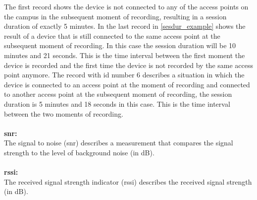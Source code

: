 The first record shows the device is not connected to any of the access points on the campus in the subsequent moment of recording, resulting in a session duration of exactly 5 minutes. In the last record in \autoref{sesdur_example} shows the result of a device that is still connected to the same access point at the subsequent moment of recording. In this case the session duration will be 10 minutes and 21 seconds. This is the time interval between the first moment the device is recorded and the first time the device is not recorded by the same access point anymore. The record with id number 6 describes a situation in which the device is connected to an access point at the moment of recording and connected to another access point at the subsequent moment of recording, the session duration is 5 minutes and 18 seconds in this case. This is the time interval between the two moments of recording.\\\\
\textbf{snr:}\\
The signal to noise (snr) describes a measurement that compares the signal strength to the level of background noise (in dB).\\\\
\textbf{rssi:} \\
The received signal strength indicator (rssi) describes the received signal strength (in dB).

